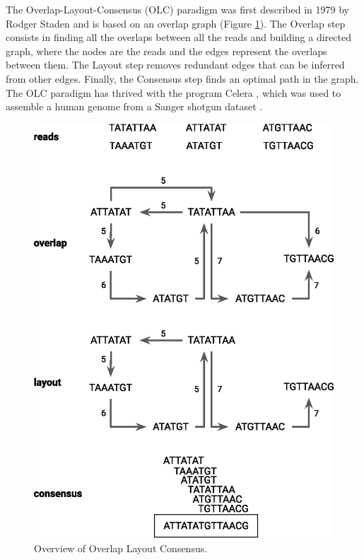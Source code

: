 The Overlap-Layout-Consensus (OLC) paradigm was first described in 1979 by Rodger Staden \cite{olc} and is based on an overlap graph (Figure \ref{fig:olc}). The Overlap step consists in finding all the overlaps between all the reads and building a directed graph, where the nodes are the reads and the edges represent the overlaps between them. The Layout step removes redundant edges that can be inferred from other edges. Finally, the Consensus step finds an optimal path in the graph. The OLC paradigm has thrived with the program Celera \cite{celera}, which was used to assemble a human genome from a Sanger shotgun dataset \cite{venter2001}. \\

\begin{figure}
    \centering
    \includegraphics[width=\textwidth]{fig/review_olc.eps}
    \caption{Overview of Overlap Layout Consensus.}
    \label{fig:olc}
\end{figure}

